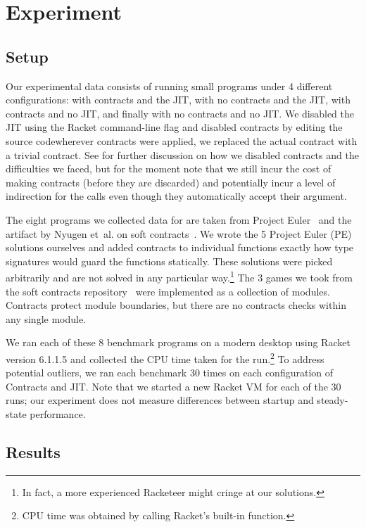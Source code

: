 \section{Experiment}
\label{experiment}
\subsection{Setup}
Our experimental data consists of running small programs under 4 different configurations: with contracts and the JIT, with no contracts and the JIT, with contracts and no JIT, and finally with no contracts and no JIT.
We disabled the JIT using the Racket command-line flag  and disabled contracts by editing the  source code\textemdash wherever contracts were applied, we replaced the actual contract with a trivial  contract.
See  for further discussion on how we disabled contracts and the difficulties we faced, but for the moment note that we still incur the cost of making contracts (before they are discarded) and potentially incur a level of indirection for the  calls even though they automatically accept their argument.

The eight programs we collected data for are taken from Project Euler~\cite{project-euler} and the artifact by Nyugen et~al. on soft contracts~\cite{soft-contracts}.
We wrote the 5 Project Euler (PE) solutions ourselves and added contracts to individual functions exactly how type signatures would guard the functions statically.
These solutions were picked arbitrarily and are not solved in any particular way.\footnote{In fact, a more experienced Racketeer might cringe at our solutions.}
The 3 games we took from the soft contracts repository~\cite{soft-contracts-repo} were implemented as a collection of modules.
Contracts protect module boundaries, but there are no contracts checks within any single module.

We ran each of these 8 benchmark programs on a modern desktop using Racket version 6.1.1.5 and collected the CPU time taken for the run.\footnote{CPU time was obtained by calling Racket's built-in  function.}
To address potential outliers, we ran each benchmark 30 times on each configuration of Contracts and JIT.
Note that we started a new Racket VM for each of the 30 runs; our experiment does not measure differences between startup and steady-state performance.

\subsection{Results}

\newpage

\newpage


\newpage

